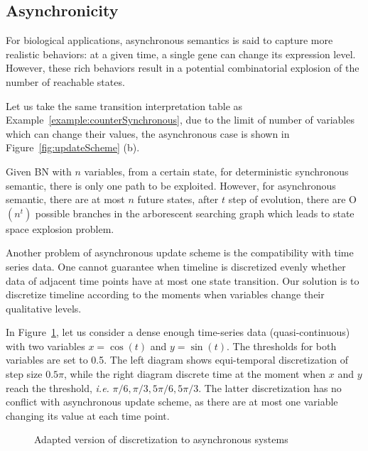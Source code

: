 \subsection{Asynchronicity}

For biological applications, asynchronous semantics is said to capture more realistic behaviors: at a given time, a single gene can change its expression level.
However, these rich behaviors result in a potential combinatorial explosion of the number of reachable states.

\begin{example}
Let us take the same transition interpretation table as Example~\ref{example:counterSynchronous}, due to the limit of number of variables which can change their values, the asynchronous case is shown in Figure~\ref{fig:updateScheme} (b).
\end{example}

Given BN with $n$ variables, from a certain state, for deterministic synchronous semantic, there is only one path to be exploited.
However, for asynchronous semantic, there are at most $n$ future states, after $t$ step of evolution, there are O$(n^t)$ possible branches in the arborescent searching graph which leads to state space explosion problem.

Another problem of asynchronous update scheme is the compatibility with time series data.
One cannot guarantee when timeline is discretized evenly whether data of adjacent time points have at most one state transition. 
Our solution is to discretize timeline according to the moments when variables change their qualitative levels.

\begin{example}
In Figure~\ref{fig:discretization}, let us consider a dense enough time-series data (quasi-continuous) with two variables $x=\cos(t)$ and $y=\sin(t)$.
The thresholds for both variables are set to 0.5.
The left diagram shows equi-temporal discretization of step size $0.5\pi$, while the right diagram discrete time at the moment when $x$ and $y$ reach the threshold, \textit{i.e.} $\pi/6,\pi/3,5\pi/6,5\pi/3$.
The latter discretization has no conflict with asynchronous update scheme, as there are at most one variable changing its value at each time point. 
\end{example}

\begin{figure}[ht]
    \centering
    
    \caption[Discretization]{Adapted version of discretization to asynchronous systems}
    \label{fig:discretization}
\end{figure}


